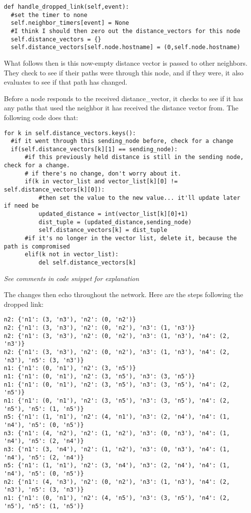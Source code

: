 \documentclass[fleqn,11pt]{article}
\begin{document}
\begin{lstlisting}
def handle_dropped_link(self,event):
  #set the timer to none
  self.neighbor_timers[event] = None
  #I think I should then zero out the distance_vectors for this node
  self.distance_vectors = {}
  self.distance_vectors[self.node.hostname] = (0,self.node.hostname)
\end{lstlisting}

What follows then is this now-empty distance vector is passed to other neighbors. They check to see if their paths were through this node, and if they were, it also evaluates to see if that path has changed.

Before a node responds to the received distance_vector, it checks to see if it has any paths that used the neighbor it has received the distance vector from. The following code does that:

\begin{lstlisting}
for k in self.distance_vectors.keys():
  #if it went through this sending_node before, check for a change
  if(self.distance_vectors[k][1] == sending_node):
      #if this previously held distance is still in the sending node, check for a change.
      # if there's no change, don't worry about it.
      if(k in vector_list and vector_list[k][0] != self.distance_vectors[k][0]):
          #then set the value to the new value... it'll update later if need be
          updated_distance = int(vector_list[k][0]+1)
          dist_tuple = (updated_distance,sending_node)
          self.distance_vectors[k] = dist_tuple
      #if it's no longer in the vector list, delete it, because the path is compromised
      elif(k not in vector_list):
          del self.distance_vectors[k]
\end{lstlisting}

\emph{See comments in code snippet for explanation}

The changes then echo throughout the network. Here are the steps following the dropped link:

\begin{lstlisting}
n2: {'n1': (3, 'n3'), 'n2': (0, 'n2')}
n2: {'n1': (3, 'n3'), 'n2': (0, 'n2'), 'n3': (1, 'n3')}
n2: {'n1': (3, 'n3'), 'n2': (0, 'n2'), 'n3': (1, 'n3'), 'n4': (2, 'n3')}
n2: {'n1': (3, 'n3'), 'n2': (0, 'n2'), 'n3': (1, 'n3'), 'n4': (2, 'n3'), 'n5': (3, 'n3')}
n1: {'n1': (0, 'n1'), 'n2': (3, 'n5')}
n1: {'n1': (0, 'n1'), 'n2': (3, 'n5'), 'n3': (3, 'n5')}
n1: {'n1': (0, 'n1'), 'n2': (3, 'n5'), 'n3': (3, 'n5'), 'n4': (2, 'n5')}
n1: {'n1': (0, 'n1'), 'n2': (3, 'n5'), 'n3': (3, 'n5'), 'n4': (2, 'n5'), 'n5': (1, 'n5')}
n5: {'n1': (1, 'n1'), 'n2': (4, 'n1'), 'n3': (2, 'n4'), 'n4': (1, 'n4'), 'n5': (0, 'n5')}
n3: {'n1': (4, 'n2'), 'n2': (1, 'n2'), 'n3': (0, 'n3'), 'n4': (1, 'n4'), 'n5': (2, 'n4')}
n3: {'n1': (3, 'n4'), 'n2': (1, 'n2'), 'n3': (0, 'n3'), 'n4': (1, 'n4'), 'n5': (2, 'n4')}
n5: {'n1': (1, 'n1'), 'n2': (3, 'n4'), 'n3': (2, 'n4'), 'n4': (1, 'n4'), 'n5': (0, 'n5')}
n2: {'n1': (4, 'n3'), 'n2': (0, 'n2'), 'n3': (1, 'n3'), 'n4': (2, 'n3'), 'n5': (3, 'n3')}
n1: {'n1': (0, 'n1'), 'n2': (4, 'n5'), 'n3': (3, 'n5'), 'n4': (2, 'n5'), 'n5': (1, 'n5')}
\end{lstlisting}
\end{document}
